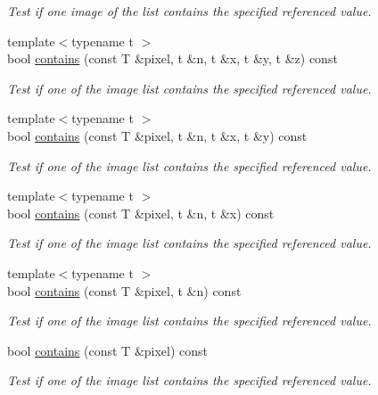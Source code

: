 \begin{DoxyCompactItemize}
\begin{DoxyCompactList}\small\item\em Test if one image of the list contains the specified referenced value. \end{DoxyCompactList}\item 
{\footnotesize template$<$typename t $>$ }\\bool \hyperlink{structcimg__library__suffixed_1_1CImgList_aebbd46d15554df131419452785f09e08}{contains} (const T \&pixel, t \&n, t \&x, t \&y, t \&z) const
\begin{DoxyCompactList}\small\item\em Test if one of the image list contains the specified referenced value. \end{DoxyCompactList}\item 
{\footnotesize template$<$typename t $>$ }\\bool \hyperlink{structcimg__library__suffixed_1_1CImgList_a22dcd21dec172946e8c18abf4d78ea14}{contains} (const T \&pixel, t \&n, t \&x, t \&y) const
\begin{DoxyCompactList}\small\item\em Test if one of the image list contains the specified referenced value. \end{DoxyCompactList}\item 
{\footnotesize template$<$typename t $>$ }\\bool \hyperlink{structcimg__library__suffixed_1_1CImgList_adfe00b186714fbd8f1994fa86cf610a5}{contains} (const T \&pixel, t \&n, t \&x) const
\begin{DoxyCompactList}\small\item\em Test if one of the image list contains the specified referenced value. \end{DoxyCompactList}\item 
{\footnotesize template$<$typename t $>$ }\\bool \hyperlink{structcimg__library__suffixed_1_1CImgList_adb520aff37247c279a09ea17781c6ca9}{contains} (const T \&pixel, t \&n) const
\begin{DoxyCompactList}\small\item\em Test if one of the image list contains the specified referenced value. \end{DoxyCompactList}\item 
bool \hyperlink{structcimg__library__suffixed_1_1CImgList_af3fb65a83103dfa356a86f5f0eceddcc}{contains} (const T \&pixel) const
\begin{DoxyCompactList}\small\item\em Test if one of the image list contains the specified referenced value. \end{DoxyCompactList}\item 

\end{DoxyCompactItemize}
